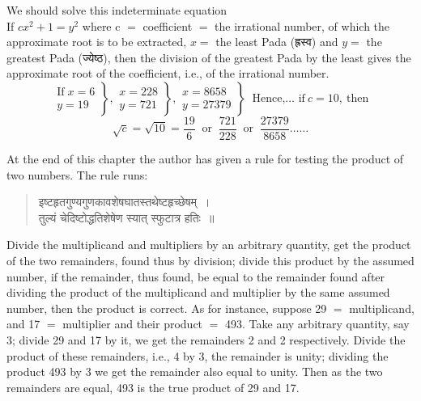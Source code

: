 \documentclass[11pt, openany]{book}
\begin{document}
\noindent We should solve this indeterminate equation \\
\indent If $cx^{2}+1 = y^{2}$ where c $=$ coefficient $=$ the irrational
number, 
of which the approximate root is to be extracted, $x=$ the least 
Pada (ह्रस्व) and $y=$ the greatest Pada (ज्येष्ठ), then the 
division of the greatest Pada by the least gives the approximate 
root of the coefficient, i.e., of the irrational number. 
\begin{equation*}
    \left. \begin{array}{l}
    \text{If}\; x = 6\\
         y = 19  
\end{array}\right\}, \left. \begin{array}{l}
         x = 228  \\
         y = 721
\end{array}\right\}, \left. \begin{array}{l}
     x = 8658\\
       y = 27379   
\end{array}\right\}\;\; \text{Hence,\ldots\ if}\ c = 10,\ \text{then} 
\end{equation*}
\begin{equation*}
    \sqrt{c} = \sqrt{10} = \dfrac{19}{6}\;\; \text{or}\;\; \dfrac{721}{228}\;\; \text{or}\;\; \dfrac{27379}{8658}\ldots\ldots 
\end{equation*}

 At the end of this chapter the author has given a rule 
for testing the product of two numbers. The rule runs: 
\vspace{-2mm}

\begin{quote}
     \qt 
   इष्टहृतगुण्यगुणकावशेषघातस्तथेष्टहृच्छेषम्~। \\
 तुल्यं चेदिष्टोद्धतिशेषेण स्यात् स्फुटात्र हतिः~॥~
\end{quote}
\vspace{-2mm}

 Divide the multiplicand and multipliers by an arbitrary 
quantity, get the product of the two remainders, found thus by 
division; divide this product by the assumed number, if the 
remainder, thus found, be equal to the remainder found after 
dividing the product of the multiplicand and multiplier by the 
same assumed number, then the product is correct. As for 
instance, suppose 29 $=$ multiplicand, and 17 $=$ multiplier and 
their product $=$ 493. Take any arbitrary quantity, say 3; 
divide 29 and 17 by it, we get the remainders 2 and 2 respectively. Divide the product of these remainders, i.e., 4 by 3, 
the remainder is unity; dividing the product 493 by 3 we get 
the remainder also equal to unity. Then as the two remainders are equal, 493 is the true product of 29 and 17. 
\end{document}
